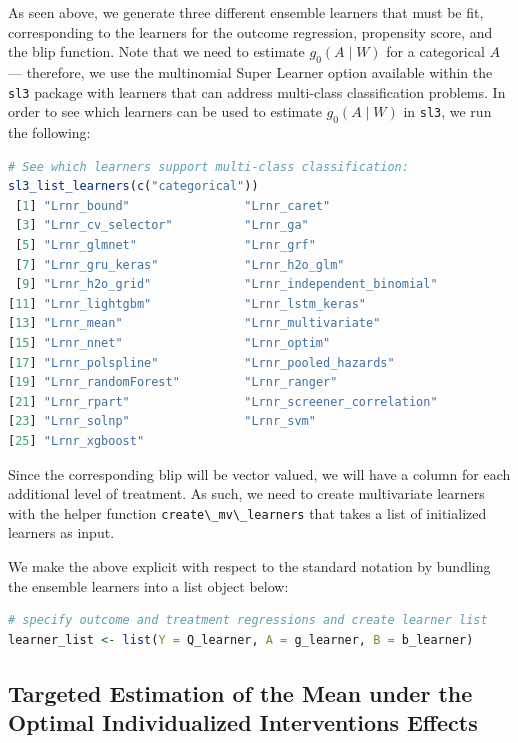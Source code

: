 \documentclass[
  12pt, krantz2,
]{krantz}
\newcommand{\passthrough}[1]{#1}
\newcommand{\1}{\mathbbm{1}}
\theoremstyle{definition}
\theoremstyle{definition}
\theoremstyle{definition}
\theoremstyle{definition}
\theoremstyle{remark}
\begin{document}
As seen above, we generate three different ensemble learners that must be fit,
corresponding to the learners for the outcome regression, propensity score, and
the blip function. Note that we need to estimate \(g_0(A \mid W)\) for a
categorical \(A\) --- therefore, we use the multinomial Super Learner option
available within the \passthrough{\lstinline!sl3!} package with learners that can address multi-class
classification problems. In order to see which learners can be used to estimate
\(g_0(A \mid W)\) in \passthrough{\lstinline!sl3!}, we run the following:

\begin{lstlisting}[language=R]
# See which learners support multi-class classification:
sl3_list_learners(c("categorical"))
 [1] "Lrnr_bound"                "Lrnr_caret"               
 [3] "Lrnr_cv_selector"          "Lrnr_ga"                  
 [5] "Lrnr_glmnet"               "Lrnr_grf"                 
 [7] "Lrnr_gru_keras"            "Lrnr_h2o_glm"             
 [9] "Lrnr_h2o_grid"             "Lrnr_independent_binomial"
[11] "Lrnr_lightgbm"             "Lrnr_lstm_keras"          
[13] "Lrnr_mean"                 "Lrnr_multivariate"        
[15] "Lrnr_nnet"                 "Lrnr_optim"               
[17] "Lrnr_polspline"            "Lrnr_pooled_hazards"      
[19] "Lrnr_randomForest"         "Lrnr_ranger"              
[21] "Lrnr_rpart"                "Lrnr_screener_correlation"
[23] "Lrnr_solnp"                "Lrnr_svm"                 
[25] "Lrnr_xgboost"             
\end{lstlisting}

Since the corresponding blip will be vector valued, we will have a
column for each additional level of treatment. As such, we need to create
multivariate learners with the helper function \passthrough{\lstinline!create\_mv\_learners!} that takes a
list of initialized learners as input.

We make the above explicit with respect to the standard notation by bundling the
ensemble learners into a list object below:

\begin{lstlisting}[language=R]
# specify outcome and treatment regressions and create learner list
learner_list <- list(Y = Q_learner, A = g_learner, B = b_learner)
\end{lstlisting}

\hypertarget{oit-eval-cat-v1}{%
\subsection{Targeted Estimation of the Mean under the Optimal Individualized Interventions Effects}\label{oit-eval-cat-v1}}
\end{document}
